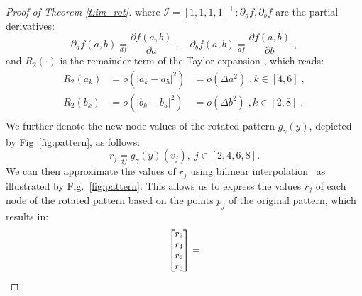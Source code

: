 \documentclass[10pt,journal,compsoc]{IEEEtran}
\newcommand{\df}{\mathop{=}\limits_{df}}
\begin{document}
\begin{proof}[Proof of Theorem \ref{t:im_rot}]
		\noindent
		where $\mathcal{I} = [1,1,1,1]^\intercal: \partial_a f, \partial_b f$ are the partial derivatives:
		\begin{equation}
		\partial_a f(a,b) \df \frac{\partial f(a, b)}{\partial a}\;, \quad \partial_b f(a,b) \df \frac{\partial f(a, b)}{\partial b} \;,
		\end{equation}
		and $R_2(\cdot)$ is the remainder term of the Taylor expansion%
		, which reads:
		\begin{equation}
		\begin{array}{rll}
		R_2(a_k) &= o(|a_k-a_5|^2) &= o(\Delta a^2) \;, k \in [4,6] \;, \\
		R_2(b_k) &= o(|b_k-b_5|^2) &= o(\Delta b^2) \;, k \in [2,8] \;.\\
		\end{array}
		\end{equation}
		\noindent
		We further denote the new node values of the rotated pattern $g_\gamma(y)$, depicted by Fig~\ref{fig:pattern}, as follows:
		\begin{equation}
		r_j \df g_\gamma(y)(v_j),\;  j \in [2,4,6,8].
		\label{eq:rj}
		\end{equation}
		\noindent
		We can then approximate the values of $r_j$ using bilinear interpolation~\cite{bb:Szeliski10} as illustrated by Fig.~\ref{fig:pattern}. This allows us to express the values $r_j$ of each node of the rotated pattern based on the points $p_j$ of the original pattern, which results in:
		\begin{equation}
		\small
		\begin{bmatrix}
		r_2 \\ r_4 \\ r_6 \\ r_8 \\
		\end{bmatrix} =

\end{equation}
\end{proof}
\end{document}
